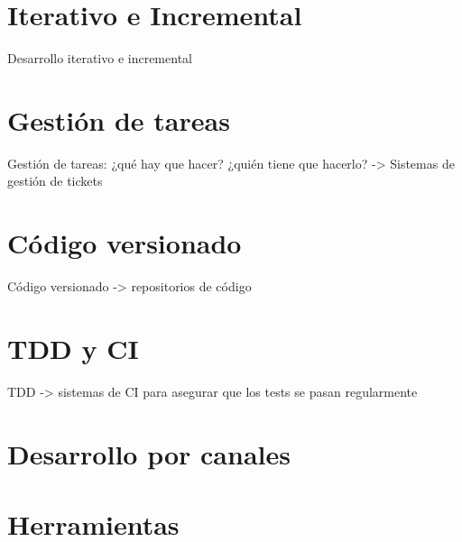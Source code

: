 
\section{Iterativo e Incremental}
\label{sec:iterativo-incremental}

Desarrollo iterativo e incremental

\section{Gestión de tareas}
\label{sec:gestion-tareas}

\par Gestión de tareas: ¿qué hay que hacer? ¿quién tiene que hacerlo? -> Sistemas de gestión de tickets

\section{Código versionado}
\label{sec:codigo-versionado}

\par Código versionado -> repositorios de código


\section{TDD y CI}
\label{sec:tdd-ci}

\par TDD -> sistemas de CI para asegurar que los tests se pasan regularmente


\section{Desarrollo por canales}
\label{sec:desarrollo-canales}


\section{Herramientas}
\label{sec:herramientas}


